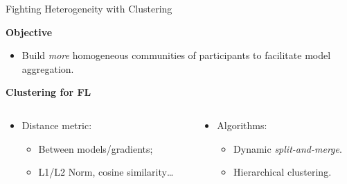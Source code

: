 % 
\begin{frame}{Fighting Heterogeneity with Clustering}
  
  \textbf{Objective}
  \begin{itemize}
    \item Build \emph{more} homogeneous communities of participants to facilitate model aggregation.
  \end{itemize}


    \pause
    \textbf{Clustering for FL}

    \begin{columns}
        
        \begin{column}{.5\textwidth}
            \begin{itemize}
                \item Distance metric:
                \begin{itemize}
                    \item Between models/gradients;
                    \item L1/L2 Norm, cosine similarity\dots~\cite{briggs_Federatedlearninghierarchical_2020}
                \end{itemize}
            \end{itemize}
        \end{column}
    
        \pause
        \begin{column}{.45\textwidth}
              \begin{itemize}
    
              \item Algorithms:
              \begin{itemize}
                \item Dynamic \emph{split-and-merge}.~\autocite{chen_ZeroKnowledgeClustering_2021}
                \item Hierarchical clustering.~\autocite{briggs_Federatedlearninghierarchical_2020}
              \end{itemize}
            \end{itemize}
    
        \end{column}
    \end{columns}

\end{frame}

